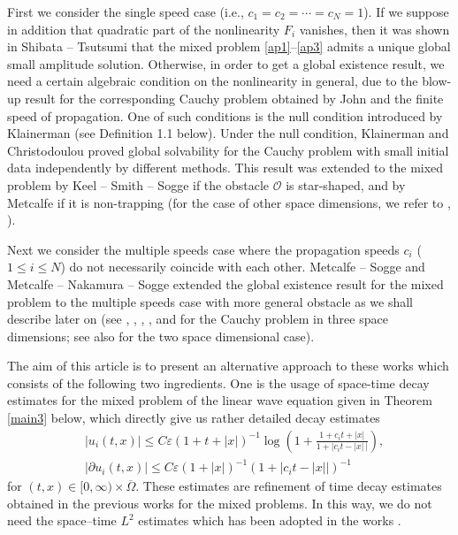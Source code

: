 \documentclass[12pt]{amsart}
\numberwithin{equation}{section}
\begin{document}
First we consider the single speed case (i.e., $c_1=c_2=\cdots =c_N=1$).
If we suppose in addition that quadratic part of the nonlinearity $F_i$ vanishes, then
it was shown in Shibata -- Tsutsumi \cite{ShiTsu86} that 
the mixed problem \eqref{ap1}--\eqref{ap3} admits a unique global small amplitude solution.
Otherwise, in order to get a global existence result, we need a certain
algebraic condition on the nonlinearity in general, due to the blow-up result
for the corresponding Cauchy problem obtained by John \cite{john3} and the finite speed
of propagation. 
One of such conditions is the null condition introduced by Klainerman
\cite{Kla86} (see Definition 1.1 below). 
Under the null condition, Klainerman \cite{Kla86} and 
Christodoulou \cite{Chr86} proved 
global solvability for the Cauchy problem with small initial data
independently by different methods.
This result was extended to the mixed problem by Keel -- Smith -- Sogge \cite{KeSmiSo02G} 
if the obstacle ${\mathcal O}$ is star-shaped, and by Metcalfe \cite{Met04}
if it is non-trapping
(for the case of other space dimensions, we refer to \cite{ShiTsu86}, \cite{Ha95}).

Next we consider the multiple speeds case where the propagation speeds
$c_i$ ($1\le i\le N$) do not necessarily coincide with each other.
Metcalfe -- Sogge \cite{MetSo05} and
Metcalfe -- Nakamura -- Sogge \cite{MetNaSo05a, MetNaSo05b}
extended the global existence result for the mixed problem 
to the multiple speeds case with more general obstacle 
as we shall describe later on
(see \cite{Kov89}, \cite{Yok00}, \cite{Kub-Yok01}, \cite{Kat04:02}, and
 \cite{kayo} for the Cauchy problem in three space dimensions; see also \cite{hk2} for the two space dimensional case).

The aim of this article is to present an alternative approach 
to these works 
which consists of the following two ingredients.
One is the usage of space-time decay estimates for the mixed problem of the linear wave equation
given in Theorem \ref{main3} below,
which directly give us rather detailed decay estimates
\begin{align}\label{std0}
& |u_i(t,x)| \le C \varepsilon (1+t+|x|)^{-1} \log\left(1+\frac{1+c_it+|x|}{1+|c_it-|x|\,|}\right),
\\ \label{std1}
& |\partial u_i(t,x)| \le C \varepsilon (1+|x|)^{-1} (1+|c_i t-|x||)^{-1}
\end{align}
for $(t,x) \in [0,\infty) \times \overline{\Omega}$.
These estimates are refinement of time decay estimates obtained
in the previous works for the mixed problems.
In this way, we do not
need the space--time $L^2$ estimates which has been adopted in the
works \cite{KeSmiSo02G, Met04, MetNaSo05a, MetNaSo05b, MetSo05}.
\end{document}
